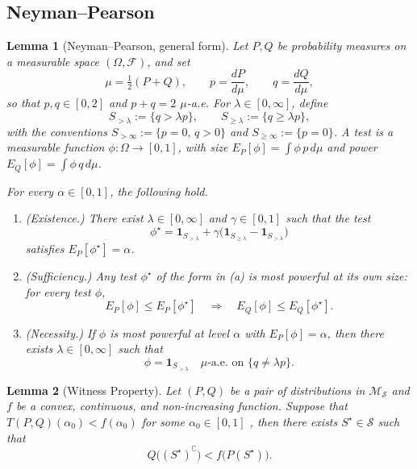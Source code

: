 \documentclass[english]{article}
\theoremstyle{plain}
\newtheorem{lemma}{Lemma}[section]
\theoremstyle{definition}
\newcommand{\Toff}[2]{T(#1,#2)}
\begin{document}
\subsection{Neyman--Pearson}
\begin{lemma}[Neyman--Pearson, general form]\label{lem:neyman-pearson}
Let $P,Q$ be probability measures on a measurable space $(\Omega,\mathcal F)$, and set
\[
\mu=\tfrac{1}{2}(P+Q),\qquad p=\frac{dP}{d\mu},\qquad q=\frac{dQ}{d\mu},
\]
so that $p,q\in[0,2]$ and $p+q=2$ $\mu$-a.e. For $\lambda\in[0,\infty]$, define
\[
S_{>\lambda}:=\{q>\lambda p\},\qquad S_{\geqslant\lambda}:=\{q\geqslant\lambda p\},
\]
with the conventions $S_{>\infty}:=\{p=0,\,q>0\}$ and $S_{\geqslant\infty}:=\{p=0\}$.
A \emph{test} is a measurable function $\phi:\Omega\to[0,1]$, with size $E_P[\phi]=\int\phi\,p\,d\mu$ and power $E_Q[\phi]=\int\phi\,q\,d\mu$.

For every $\alpha\in[0,1]$, the following hold.

\begin{enumerate}
\item[(a)] \emph{(Existence.)} There exist $\lambda\in[0,\infty]$ and $\gamma\in[0,1]$ such that the test
\[
\phi^\star=\mathbf 1_{S_{>\lambda}}+\gamma\bigl(\mathbf 1_{S_{\geqslant\lambda}}-\mathbf 1_{S_{>\lambda}}\bigr)
\]
satisfies $E_P[\phi^\star]=\alpha$.

\item[(b)] \emph{(Sufficiency.)} Any test $\phi^\star$ of the form in (a) is most powerful at its own size: for every test $\phi$,
\[
E_P[\phi]\leqslant E_P[\phi^\star]\quad\Longrightarrow\quad E_Q[\phi]\leqslant E_Q[\phi^\star].
\]

\item[(c)] \emph{(Necessity.)} If $\phi$ is most powerful at level $\alpha$ with $E_P[\phi]=\alpha$, then there exists $\lambda\in[0,\infty]$ such that
\[
\phi=\mathbf 1_{S_{>\lambda}}\quad\mu\text{-a.e. on } \{q\neq\lambda p\}.
\]
\end{enumerate}
\end{lemma}




\begin{lemma}[Witness Property]\label{lem:witness}
Let $(P,Q)$ be a pair of distributions in $\mathcal M_{\mathcal S}$ and $f$ be a convex, continuous, and non-increasing function. Suppose that $\Toff{P}{Q}(\alpha_0) < f(\alpha_0)$ for some $\alpha_0 \in [0,1]$ , then there exists $S^\star\in \mathcal S$ such that
\[
Q\bigl((S^\star)^\complement\bigr) < f\bigl(P(S^\star)\bigr).
\]
\end{lemma}
\end{document}
